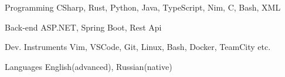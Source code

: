 

\begin{cvskills}

  \cvskill
    {Programming} %
    {CSharp, Rust, Python, Java, TypeScript, Nim, C, Bash, XML} %

  \cvskill
  {Back-end} %
  {ASP.NET, Spring Boot, Rest Api} %

  \cvskill
    {Dev. Instruments} %
    {Vim, VSCode, Git, Linux, Bash, Docker, TeamCity etc.} %

  \cvskill
  {Languages} %
  {English(advanced), Russian(native)} %

\end{cvskills}
